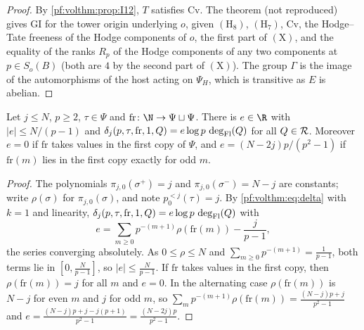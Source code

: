 \begin{proof}
By \cref{pf:volthm:prop:I12}, $T$ satisfies $\mathrm{Cv}$. The theorem
 (not reproduced) gives $\mathrm{GI}$ for the tower origin
underlying $o$, given $(\mathrm{H}_8)$, $(\mathrm{H}_7)$, $\mathrm{Cv}$, the Hodge--Tate freeness of the Hodge
components of $o$, the first part of $(\mathrm{X})$, and the equality of the ranks $R_p$ of the Hodge components of
any two components at $p\in S_o(B)$ (both are $4$ by the second part of $(\mathrm{X})$). The group $\Gamma$ is the
image of the automorphisms of the host acting on $\Psi_H$, which is transitive as $E$ is abelian.
\end{proof}

\begin{lemma}[The terms with $k=1$]\label{pf:volthm:lem:deltaone}
Let $j\le N$, $p\ge2$, $\tau\in\Psi$ and $\mathrm{fr}\colon\N\to\Psi\sqcup\Psi$. There is $e\in\R$ with
$|e|\le N/(p-1)$ and $\delta_j(p,\tau,\mathrm{fr},1,Q)=e\log p\,\deg_{\mathrm{Fl}}(Q)$ for all $Q\in\mathcal{R}$. Moreover
$e=0$ if $\mathrm{fr}$ takes values in the first copy of $\Psi$, and $e=(N-2j)p/(p^2-1)$ if $\mathrm{fr}(m)$ lies in
the first copy exactly for odd $m$.
\end{lemma}

\begin{proof}
The polynomials $\pi_{j,0}(\sigma^+)=j$ and $\pi_{j,0}(\sigma^-)=N-j$ are constants; write $\rho(\sigma)$ for
$\pi_{j,0}(\sigma)$, and note $p^{<j}_0(\tau)=j$. By \eqref{pf:volthm:eq:delta} with $k=1$ and linearity,
$\delta_j(p,\tau,\mathrm{fr},1,Q)=e\log p\,\deg_{\mathrm{Fl}}(Q)$ with
\[
e=\sum_{m\ge0}p^{-(m+1)}\rho(\mathrm{fr}(m))-\frac j{p-1},
\]
the series converging absolutely. As $0\le\rho\le N$ and $\sum_{m\ge0}p^{-(m+1)}=\frac1{p-1}$, both terms lie in
$[0,\frac N{p-1}]$, so $|e|\le\frac N{p-1}$. If $\mathrm{fr}$ takes values in the first copy, then
$\rho(\mathrm{fr}(m))=j$ for all $m$ and $e=0$. In the alternating case $\rho(\mathrm{fr}(m))$ is $N-j$ for even $m$
and $j$ for odd $m$, so $\sum_mp^{-(m+1)}\rho(\mathrm{fr}(m))=\frac{(N-j)p+j}{p^2-1}$ and
$e=\frac{(N-j)p+j-j(p+1)}{p^2-1}=\frac{(N-2j)p}{p^2-1}$.
\end{proof}

